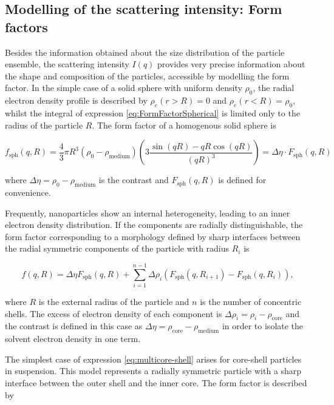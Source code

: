 \subsection{Modelling of the scattering intensity: Form factors}

Besides the information obtained about the size distribution of the particle ensemble, the scattering intensity $I(q)$ provides very precise information about the shape and composition of the particles, accessible by modelling the form factor. In the simple case of a solid sphere with uniform density $\rho_0$, the radial electron density profile is described by $\rho_e(r>R)=0$ and $\rho_e(r<R)=\rho_0$, whilst the integral of expression \ref{eq:FormFactorSpherical} is limited only to the radius of the particle $R$. The form factor of a homogenous solid sphere is 

\begin{equation}
       f_{\text{sph}}(q,R)=\frac{4}{3}\pi R^3 \left( \rho_0 - \rho_{\text{medium}} \right) \left( 3\frac{\sin(qR)-qR\cos(qR)}{\left( qR \right)^3} \right) = \Delta \eta \cdot F_{\text{sph}}(q,R)
\end{equation}

where $\Delta \eta = \rho_0 - \rho_{\text{medium}}$ is the contrast and $ F_{\text{sph}}(q,R)$ is defined for convenience. 

Frequently, nanoparticles show an internal heterogeneity, leading to an inner electron density distribution. If the components are radially distinguishable, the form factor corresponding to a morphology defined by sharp interfaces between the radial symmetric components of the particle with radius \(R_i\) is

\begin{equation}
\label{eq:multicore-shell}
f\left(q,R \right)= \Delta \eta F_{\text{sph}}(q,R)+\sum_{i=1}^{n-1} \Delta\rho_i \left( F_{\text{sph}}(q,R_{i+1})-F_{\text{sph}}(q,R_{i}) \right) ,
\end{equation}

where \(R\) is the external radius of the particle and \( n \) is the number of concentric shells. The excess of electron density of each component is $\Delta\rho_i = \rho_i - \rho_{\text{core}}$ and the contrast is defined in this case as $\Delta \eta = \rho_{\text{core}} - \rho_{\text{medium}}$ in order to isolate the solvent electron density in one term.

The simplest case of expression \ref{eq:multicore-shell} arises for core-shell particles in suspension. This model represents a radially symmetric particle with a sharp interface between the outer shell and the inner core. The form factor is described by

